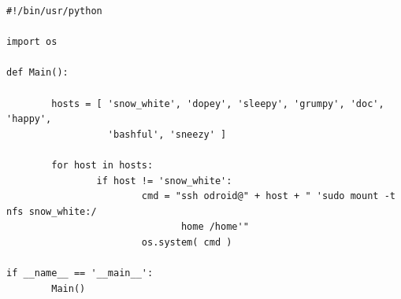 \begin{lstlisting}
#!/bin/usr/python

import os

def Main():

        hosts = [ 'snow_white', 'dopey', 'sleepy', 'grumpy', 'doc', 'happy',
 				  'bashful', 'sneezy' ]

        for host in hosts:
                if host != 'snow_white':
                        cmd = "ssh odroid@" + host + " 'sudo mount -t nfs snow_white:/
							   home /home'"
                        os.system( cmd )

if __name__ == '__main__':
        Main()
\end{lstlisting}

